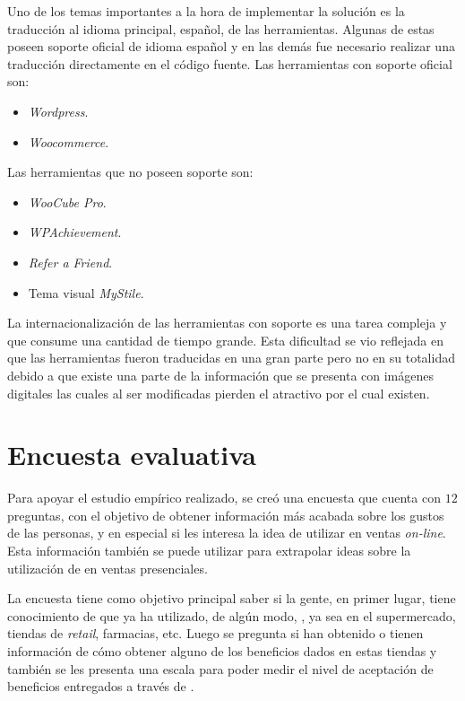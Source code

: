 Uno de los temas importantes a la hora de implementar la solución es la traducción al idioma principal, español, 
 de las herramientas. Algunas de estas poseen soporte oficial de idioma español y en las demás fue necesario 
realizar una traducción directamente en el código fuente. Las herramientas con soporte oficial son:

\begin{itemize}

\item \emph{Wordpress}.
\item \emph{Woocommerce}.

\end{itemize}

Las herramientas que no poseen soporte son:

\begin{itemize}

\item \emph{WooCube Pro}.
\item \emph{WPAchievement}.
\item \emph{Refer a Friend}.
\item Tema visual \emph{MyStile}.

\end{itemize}

La internacionalización de las herramientas con soporte es una tarea compleja y que consume una cantidad
de tiempo grande. Esta dificultad se vio reflejada en que las herramientas fueron traducidas en una gran
parte pero no en su totalidad debido a que existe una parte de la información que se presenta con imágenes
digitales las cuales al ser modificadas pierden el atractivo por el cual existen.



\section{Encuesta evaluativa}

Para apoyar el estudio empírico realizado, se creó una encuesta que cuenta con $12$ preguntas, con el
objetivo de obtener información más acabada sobre los gustos de las personas, y en especial
si les interesa la idea de utilizar {\gam} en ventas \emph{on-line}. Esta información
también se puede utilizar para extrapolar ideas sobre la utilización de {\gam} en
ventas presenciales.

La encuesta tiene como objetivo principal saber si la gente, en primer lugar, tiene conocimiento
de que ya ha utilizado, de algún modo, {\gam}, ya sea en el supermercado, tiendas de \emph{retail},
farmacias, etc. Luego se pregunta si han obtenido o tienen información de cómo obtener alguno
de los beneficios dados en estas tiendas y también se les presenta una escala para poder medir
el nivel de aceptación de beneficios entregados a través de {\gam}.

